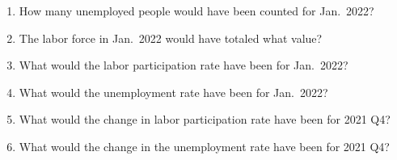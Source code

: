 \documentclass{assignment}
\begin{document}
\begin{enumerate}
\begin{enumerate}
\item How many unemployed people would have been counted for Jan.~2022?

\vfill

\item The labor force in Jan.~2022 would have totaled what value?

\vfill

\item What would the labor participation rate have been for Jan.~2022?

\vfill

\item What would the unemployment rate have been for Jan.~2022?

\vfill

\item What would the change in labor participation rate have been for 2021 Q4?

\vfill

\item What would the change in the unemployment rate have been for 2021 Q4?

\vfill
\vspace{-2\baselineskip}

\end{enumerate}
\end{enumerate}
\end{document}
